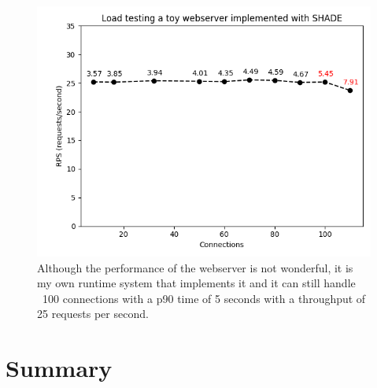 \documentclass[class=article, crop=false]{standalone}
\begin{document}
\begin{figure}
    \centering
    \includegraphics[width=35em]{eval_plots/webserver.png}
    \caption{Although the performance of the webserver is not wonderful, it is my own runtime system that implements it and it can still handle ~100 connections with a p90 time of 5 seconds with a throughput of 25 requests per second.}
    \label{fig:hello-online-world}
\end{figure}

\section{Summary}
\end{document}
